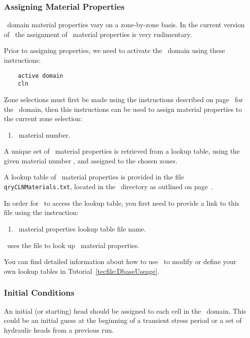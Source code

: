 \subsubsection{Assigning Material Properties}  
\cln\ domain material properties vary on a zone-by-zone basis.  In the current version of \mut\, the assignment of \cln\ material properties is very rudimentary.  

Prior to assigning properties, we need to activate the \cln\ domain using these instructions:
\begin{verbatim}
    active domain
    cln
\end{verbatim}

Zone selections must first be made using the instructions described on page~\pageref{page:zoneSelect} for the \gwf\ domain, then this instructions can be used to assign material properties to the current zone selection:

    {
        \squish
        \begin{enumerate}
        \item {}  \cln\ material number.
        \end{enumerate}
          A unique set of \cln\ material properties is retrieved from a lookup table, using the given  material number , and assigned to the chosen zones.
    }

A lookup table of \cln\ material properties  is provided in the file \texttt{qryCLNMaterials.txt}, located in the \bin\ directory as outlined on page~\pageref{page:userbin}.

In order for \mut\ to access the lookup table, you first need to provide a link to this file using the instruction:

    {
        \squish
        \begin{enumerate}
        \item {}  \cln\ material properties lookup table file name.
        \end{enumerate}
          \mut\ uses the file  to look up \cln\ material properties.
    }


You can find detailed information about how to use \dbase\ to modify or define your own lookup tables in Tutorial~\ref{tecfile:DbaseUseage}.

\subsubsection{Initial Conditions}  
An initial (or starting) head should be assigned to each cell in the \cln\ domain.  This could be an initial guess at the beginning of a transient stress period or a set of hydraulic heads from a previous run.

